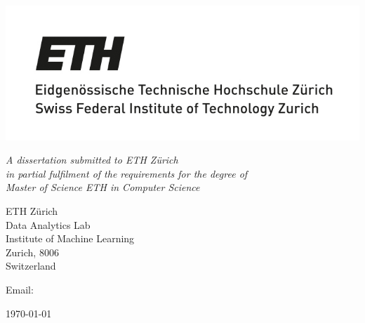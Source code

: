 \begin{titlepage} 

\begin{center}
\noindent
\huge
\dissertationtitle \\
\end{center}

\begin{center}
\noindent
\huge
\authorname \\
\Large
\authorcollege      \\[24pt]
\includegraphics{uni.jpg}
\end{center}

\vspace{24pt} 

\begin{center}
\noindent
\large
{\it A dissertation submitted to ETH Zürich \\ 
in partial fulfilment of the requirements for the degree of \\ 
Master of Science ETH in Computer Science} 
\end{center}

\begin{center}
\noindent
ETH Zürich \\
Data Analytics Lab     \\
Institute of Machine Learning  \\
Zurich, 8006 \\
{\sc Switzerland}    \\
\end{center}

\begin{center}
\noindent
Email: \authoremail \\
\end{center}

\begin{center}
\noindent
\today
\end{center}

\end{titlepage} 

\newpage
\vspace*{\fill}
